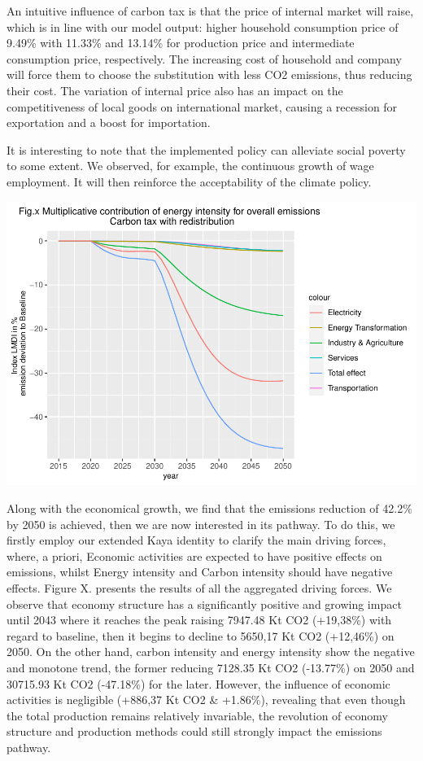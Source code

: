 \documentclass[
]{article}
\begin{document}
An intuitive influence of carbon tax is that the price of internal
market will raise, which is in line with our model output: higher
household consumption price of 9.49\% with 11.33\% and 13.14\% for
production price and intermediate consumption price, respectively. The
increasing cost of household and company will force them to choose the
substitution with less CO2 emissions, thus reducing their cost. The
variation of internal price also has an impact on the competitiveness of
local goods on international market, causing a recession for exportation
and a boost for importation.

It is interesting to note that the implemented policy can alleviate
social poverty to some extent. We observed, for example, the continuous
growth of wage employment. It will then reinforce the acceptability of
the climate policy.

\begin{center}\includegraphics[width=0.7\linewidth,height=0.7\textheight]{Modele-ThreeMe-Tunisie_Sequeira_Valilou_Wang_files/figure-latex/unnamed-chunk-19-1} \end{center}

Along with the economical growth, we find that the emissions reduction
of 42.2\% by 2050 is achieved, then we are now interested in its
pathway. To do this, we firstly employ our extended Kaya identity to
clarify the main driving forces, where, a priori, Economic activities
are expected to have positive effects on emissions, whilst Energy
intensity and Carbon intensity should have negative effects. Figure X.
presents the results of all the aggregated driving forces. We observe
that economy structure has a significantly positive and growing impact
until 2043 where it reaches the peak raising 7947.48 Kt CO2 (+19,38\%)
with regard to baseline, then it begins to decline to 5650,17 Kt CO2
(+12,46\%) on 2050. On the other hand, carbon intensity and energy
intensity show the negative and monotone trend, the former reducing
7128.35 Kt CO2 (-13.77\%) on 2050 and 30715.93 Kt CO2 (-47.18\%) for the
later. However, the influence of economic activities is negligible
(+886,37 Kt CO2 \& +1.86\%), revealing that even though the total
production remains relatively invariable, the revolution of economy
structure and production methods could still strongly impact the
emissions pathway.
\end{document}
